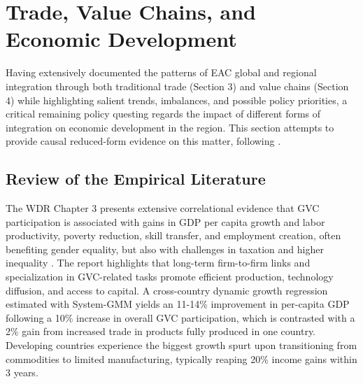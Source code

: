 \documentclass[a4paper]{article}
\begin{document}
 
 
\section{Trade, Value Chains, and Economic Development}

Having extensively documented the patterns of EAC global and regional integration through both traditional trade (Section 3) and value chains (Section 4) while highlighting salient trends, imbalances, and possible policy priorities, a critical remaining policy questing regards the impact of different forms of integration on economic development in the region. This section attempts to provide causal reduced-form evidence on this matter, following \citet{Kummritz20161}. 


\subsection{Review of the Empirical Literature}

The WDR Chapter 3 presents extensive correlational evidence that GVC participation is associated with gains in GDP per capita growth and labor productivity, poverty reduction, skill transfer, and employment creation, often benefiting gender equality, but also with challenges in taxation and higher inequality \citep{world2020trading, antras2022global}. The report highlights that long-term firm-to-firm links and specialization in GVC-related tasks promote efficient production, technology diffusion, and access to capital. A cross-country dynamic growth regression estimated with System-GMM yields an 11-14\% improvement in per-capita GDP following a 10\% increase in overall GVC participation, which is contrasted with a 2\% gain from increased trade in products fully produced in one country. Developing countries experience the biggest growth spurt upon transitioning from commodities to limited manufacturing, typically reaping 20\% income gains within 3 years. \newline
\end{document}
